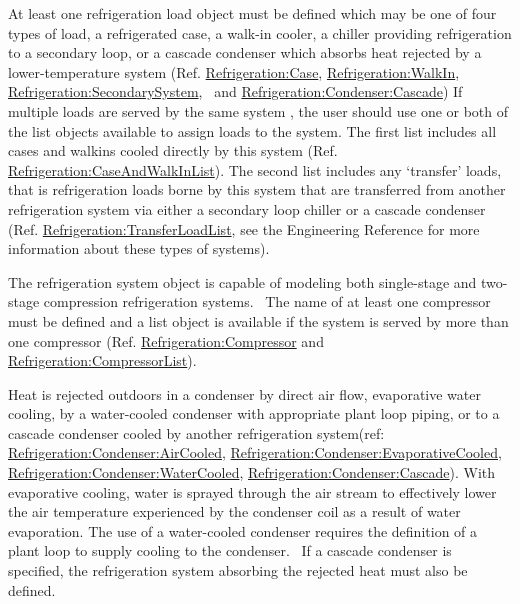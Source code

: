 At least one refrigeration load object must be defined which may be one of four types of load, a refrigerated case, a walk-in cooler, a chiller providing refrigeration to a secondary loop, or a cascade condenser which absorbs heat rejected by a lower-temperature system (Ref. \hyperref[refrigerationcase]{Refrigeration:Case}, \hyperref[refrigerationwalkin]{Refrigeration:WalkIn}, \hyperref[refrigerationsecondarysystem]{Refrigeration:SecondarySystem},~ and \hyperref[refrigerationcondensercascade]{Refrigeration:Condenser:Cascade}) If multiple loads are served by the same system , the user should use one or both of the list objects available to assign loads to the system. The first list includes all cases and walkins cooled directly by this system (Ref. \hyperref[refrigerationcaseandwalkinlist]{Refrigeration:CaseAndWalkInList}). The second list includes any `transfer' loads, that is refrigeration loads borne by this system that are transferred from another refrigeration system via either a secondary loop chiller or a cascade condenser (Ref. \hyperref[refrigerationtransferloadlist]{Refrigeration:TransferLoadList}, see the Engineering Reference for more information about these types of systems).

The refrigeration system object is capable of modeling both single-stage and two-stage compression refrigeration systems.~ The name of at least one compressor must be defined and a list object is available if the system is served by more than one compressor (Ref. \hyperref[refrigerationcompressor]{Refrigeration:Compressor} and \hyperref[refrigerationcompressorlist]{Refrigeration:CompressorList}).

Heat is rejected outdoors in a condenser by direct air flow, evaporative water cooling, by a water-cooled condenser with appropriate plant loop piping, or to a cascade condenser cooled by another refrigeration system(ref: \hyperref[refrigerationcondenseraircooled]{Refrigeration:Condenser:AirCooled}, \hyperref[refrigerationcondenserevaporativecooled]{Refrigeration:Condenser:EvaporativeCooled}, \hyperref[refrigerationcondenserwatercooled]{Refrigeration:Condenser:WaterCooled}, \hyperref[refrigerationcondensercascade]{Refrigeration:Condenser:Cascade}). With evaporative cooling, water is sprayed through the air stream to effectively lower the air temperature experienced by the condenser coil as a result of water evaporation. The use of a water-cooled condenser requires the definition of a plant loop to supply cooling to the condenser.~ If a cascade condenser is specified, the refrigeration system absorbing the rejected heat must also be defined.

